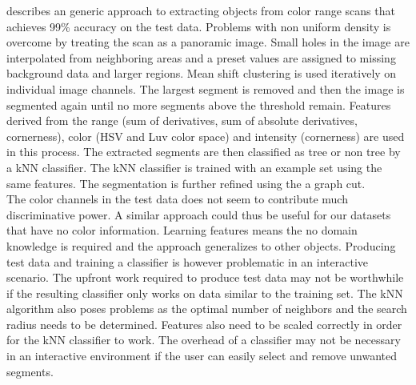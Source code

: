 
\citet{Barnea2012} describes an generic approach to extracting objects from color range scans that achieves 99\% accuracy on the test data. Problems with non uniform density is overcome by treating the scan as a panoramic image. Small holes in the image are interpolated from neighboring areas and a preset values are assigned to missing background data and larger regions. Mean shift clustering is used iteratively on individual image channels. The largest segment is removed and then the image is segmented again until no more segments above the threshold remain. Features derived from the range (sum of derivatives, sum of absolute derivatives, cornerness), color (HSV and Luv color space) and intensity (cornerness) are used in this process. The extracted segments are then classified as tree or non tree by a kNN classifier. The kNN classifier is trained with an example set using the same features. The segmentation is further refined using the a graph cut.\\

The color channels in the test data does not seem to contribute much discriminative power. A similar approach could thus be useful for our datasets that have no color information. Learning features means the no domain knowledge is required and the approach generalizes to other objects. Producing test data and training a classifier is however problematic in an interactive scenario. The upfront work required to produce test data may not be worthwhile if the resulting classifier only works on data similar to the training set. The kNN algorithm also poses problems as the optimal number of neighbors and the search radius needs to be determined. Features also need to be scaled correctly in order for the kNN classifier to work. The overhead of a classifier may not be necessary in an interactive environment if the user can easily select and remove unwanted segments.\\







